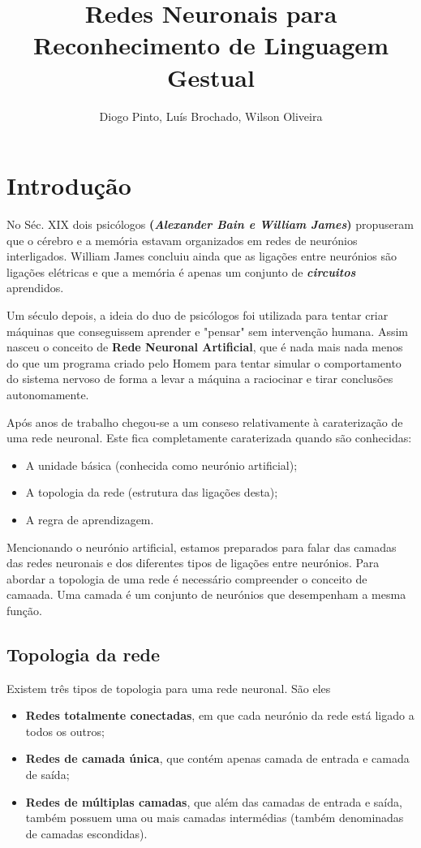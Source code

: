 \documentclass[10pt,a4paper]{article}
\author{Diogo Pinto, Luís Brochado, Wilson Oliveira}
\title{Redes Neuronais para Reconhecimento de Linguagem Gestual}
\begin{document}
\maketitle

\section{Introdução}

No Séc. XIX dois psicólogos \textbf{(\textit{Alexander Bain e William James})} propuseram que o cérebro e a memória estavam organizados em redes de neurónios interligados. William James concluiu ainda que as ligações entre neurónios são ligações elétricas e que a memória é apenas um conjunto de \textbf{\textit{circuitos}} aprendidos.

Um século depois, a ideia do duo de psicólogos foi utilizada para tentar criar máquinas que conseguissem aprender e "pensar" sem intervenção humana. Assim nasceu o conceito de \textbf{Rede Neuronal Artificial}, que é nada mais nada menos do que um programa criado pelo Homem para tentar simular o comportamento do sistema nervoso de forma a levar a máquina a raciocinar e tirar conclusões autonomamente.

Após anos de trabalho chegou-se a um conseso relativamente à caraterização de uma rede neuronal. Este fica completamente caraterizada quando são conhecidas:
\begin{itemize}
\item A unidade básica (conhecida como neurónio artificial);
\item A topologia da rede (estrutura das ligações desta);
\item A regra de aprendizagem.
\end{itemize}

Mencionando o neurónio artificial, estamos preparados para falar das camadas das redes neuronais e dos diferentes tipos de ligações entre neurónios.
Para abordar a topologia de uma rede é necessário compreender o conceito de camaada. Uma camada é um conjunto de neurónios que desempenham a mesma função.

\subsection{Topologia da rede}
Existem três tipos de topologia para uma rede neuronal. São eles
\begin{itemize}
\item \textbf{Redes totalmente conectadas}, em que cada neurónio da rede está ligado a todos os outros;
\item \textbf{Redes de camada única}, que contém apenas camada de entrada e camada de saída;
\item \textbf{Redes de múltiplas camadas}, que além das camadas de entrada e saída, também possuem uma ou mais camadas intermédias (também denominadas de camadas escondidas).
\end{itemize}
\end{document}
